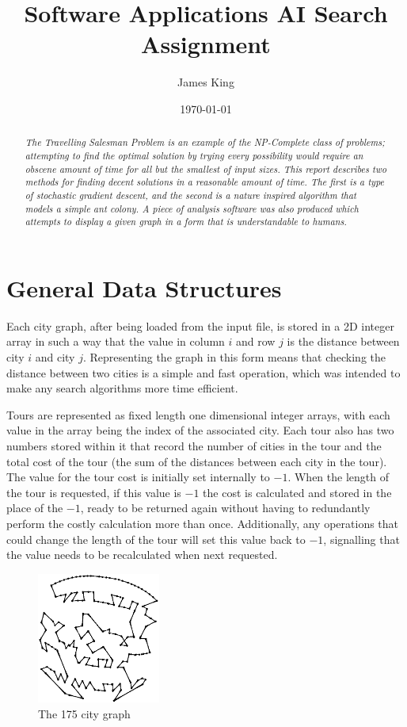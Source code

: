 \documentclass[a4paper,11pt]{article}
\title{Software Applications AI Search Assignment}
\date{\today}
\author{James King}
\begin{document}
\maketitle

\begin{abstract}
\emph{The Travelling Salesman Problem is an example of the NP-Complete class of
problems; attempting to find the optimal solution by trying every possibility
would require an obscene amount of time for all but the smallest of input
sizes. This report describes two methods for finding decent solutions in a 
reasonable amount of time. The first is a type of stochastic gradient descent,
and the second is a nature inspired algorithm that models a simple ant colony.
A piece of analysis software was also produced which attempts to display a
given graph in a form that is understandable to humans.}
\end{abstract}

\section{General Data Structures}
Each city graph, after being loaded from the input file, is stored in a 2D
integer array in such a way that the value in column $i$ and row $j$ is the
distance between city $i$ and city $j$. Representing the graph in this form
means that checking the distance between two cities is a simple and fast
operation, which was intended to make any search algorithms more time
efficient.

Tours are represented as fixed length one dimensional integer arrays, with
each value in the array being the index of the associated city. Each tour also
has two numbers stored within it that record the number of cities in the tour
and the total cost of the tour (the sum of the distances between each city in
the tour). The value for the tour cost is initially set internally to $-1$.
When the length of the tour is requested, if this value is $-1$ the cost is
calculated and stored in the place of the $-1$, ready to be returned again
without having to redundantly perform the costly calculation more than once. 
Additionally, any operations that could change the length of the tour will set
this value back to $-1$, signalling that the value needs to be recalculated
when next requested.

\begin{figure}
\includegraphics[width=0.36\textwidth]{175vis}
\caption{The 175 city graph}
\end{figure}
\end{document}
